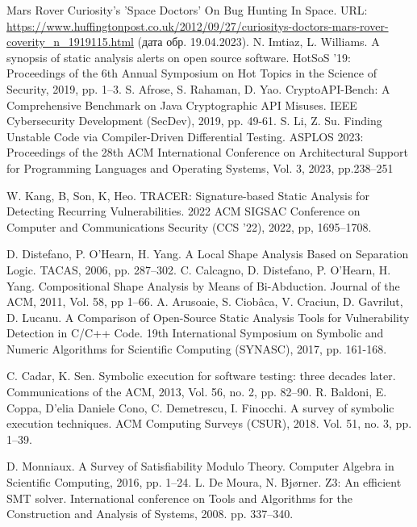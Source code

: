 \documentclass[a4paper,article,14pt]{extarticle}
\begin{document}
\begin{thebibliography}{1}
 Mars Rover Curiosity's 'Space Doctors' On Bug Hunting In Space. URL: \url{https://www.huffingtonpost.co.uk/2012/09/27/curiositys-doctors-mars-rover-coverity_n_1919115.html} (дата обр. 19.04.2023).
 N. Imtiaz, L. Williams. A synopsis of static analysis alerts on open source software. HotSoS '19: Proceedings of the 6th Annual Symposium on Hot Topics in the Science of Security, 2019, pp. 1–3.
 S. Afrose, S. Rahaman, D. Yao. CryptoAPI-Bench: A Comprehensive Benchmark on Java Cryptographic API Misuses. IEEE Cybersecurity Development (SecDev), 2019, pp. 49-61.
 S. Li, Z. Su. Finding Unstable Code via Compiler-Driven Differential Testing. ASPLOS 2023: Proceedings of the 28th ACM International Conference on Architectural Support for Programming Languages and Operating Systems, Vol. 3, 2023, pp.238–251

 W. Kang, B, Son, K, Heo. TRACER: Signature-based Static Analysis for Detecting Recurring Vulnerabilities. 2022 ACM SIGSAC Conference on Computer and Communications Security (CCS '22), 2022, pp, 1695–1708.

 D. Distefano, P. O’Hearn, H. Yang. A Local Shape Analysis Based on Separation Logic. TACAS, 2006, pp. 287–302.
 C. Calcagno, D. Distefano, P. O’Hearn, H. Yang. Compositional Shape Analysis by Means of Bi-Abduction. Journal of the ACM, 2011, Vol. 58, pp 1–66.
 A. Arusoaie, S. Ciobâca, V. Craciun, D. Gavrilut, D. Lucanu. A Comparison of Open-Source Static Analysis Tools for Vulnerability Detection in C/C++ Code. 19th International Symposium on Symbolic and Numeric Algorithms for Scientific Computing (SYNASC), 2017, pp. 161-168.

 C. Cadar, K. Sen. Symbolic execution for software testing: three decades later. Communications of the ACM, 2013, Vol. 56, no. 2, pp. 82–90.
 R. Baldoni, E. Coppa, D’elia Daniele Cono,
C. Demetrescu, I. Finocchi. A survey of symbolic
execution techniques. ACM Computing Surveys (CSUR), 2018. Vol. 51, no. 3, pp. 1–39.

 D. Monniaux. A Survey of Satisfiability Modulo Theory. Computer Algebra in Scientific Computing, 2016, pp. 1–24.
 L. De Moura, N. Bjørner. Z3: An efficient SMT
solver. International conference on Tools and Algorithms for the
Construction and Analysis of Systems, 2008. pp. 337–340.


\end{thebibliography}
\end{document}
